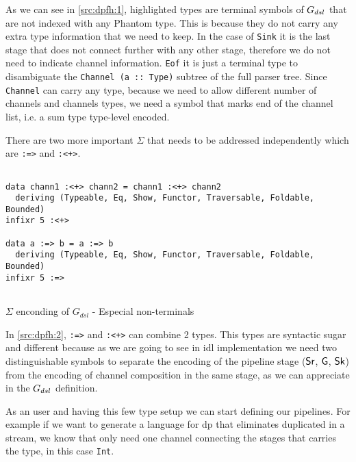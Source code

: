 As we can see in \autoref{src:dpfh:1}, highlighted types are terminal symbols of $G_{dsl}$ that are not indexed with any Phantom type. 
This is because they do not carry any extra type information that we need to keep. In the case of \texttt{Sink} it is the last stage
that does not connect further with any other stage, therefore we do not need to indicate channel information. \texttt{Eof} it is just 
a terminal type to disambiguate the \texttt{Channel (a :: Type)} subtree of the full parser tree. Since \texttt{Channel} can carry any type, 
because we need to allow different number of channels and channels types, we need a symbol that marks end of the channel list, i.e. a sum type 
type-level encoded.

There are two more important $\Sigma$ that needs to be addressed independently which are \texttt{:=>} and \texttt{:<+>}.

\begin{listing}[H]
  \begin{verbatim}

data chann1 :<+> chann2 = chann1 :<+> chann2
  deriving (Typeable, Eq, Show, Functor, Traversable, Foldable, Bounded)
infixr 5 :<+>
   
data a :=> b = a :=> b
  deriving (Typeable, Eq, Show, Functor, Traversable, Foldable, Bounded)
infixr 5 :=>
   
  \end{verbatim}
  \caption{$\Sigma$ enconding of $G_{dsl}$ - Especial non-terminals}
  \label{src:dpfh:2}
\end{listing}

In \autoref{src:dpfh:2}, \texttt{:=>} and \texttt{:<+>} can combine 2 types. This types are syntactic sugar and different
because as we are going to see in \acrshort{idl} implementation we need two distinguishable symbols to separate the encoding of the pipeline stage ($\mathsf{Sr}$, $\mathsf{G}$, $\mathsf{Sk}$)
from the encoding of channel composition in the same stage, as we can appreciate in the $G_{dsl}$ definition.

As an user and having this few type setup we can start defining our pipelines.  
For example if we want to generate a language for \acrshort{dp} that eliminates duplicated in a stream, we know that
only need one channel connecting the stages that carries the type, in this case \texttt{Int}.

